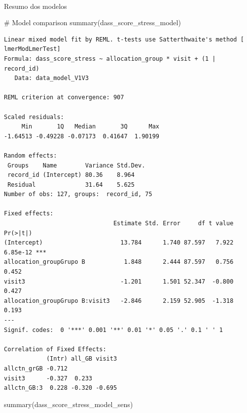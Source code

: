 \documentclass[
  letterpaper,
  DIV=11,
  numbers=noendperiod]{scrartcl}
\makeatletter
\let\oldparagraph\paragraph
\renewcommand{\paragraph}{
    \@ifstar
      \xxxParagraphStar
      \xxxParagraphNoStar
  }
\newcommand{\xxxParagraphStar}[1]{\oldparagraph*{#1}\mbox{}}
\newcommand{\xxxParagraphNoStar}[1]{\oldparagraph{#1}\mbox{}}
\newenvironment{Shaded}{\begin{snugshade}}{\end{snugshade}}
\newcommand{\CommentTok}[1]{\textcolor[rgb]{0.37,0.37,0.37}{#1}}
\newcommand{\FunctionTok}[1]{\textcolor[rgb]{0.28,0.35,0.67}{#1}}
\newcommand{\NormalTok}[1]{\textcolor[rgb]{0.00,0.23,0.31}{#1}}
\makeatother
\begin{document}
\paragraph{Resumo dos modelos}\label{resumo-dos-modelos-24}

\begin{Shaded}
\begin{Highlighting}[]
\CommentTok{\# Model comparison}
\FunctionTok{summary}\NormalTok{(dass\_score\_stress\_model)}
\end{Highlighting}
\end{Shaded}

\begin{verbatim}
Linear mixed model fit by REML. t-tests use Satterthwaite's method [
lmerModLmerTest]
Formula: dass_score_stress ~ allocation_group * visit + (1 | record_id)
   Data: data_model_V1V3

REML criterion at convergence: 907

Scaled residuals: 
     Min       1Q   Median       3Q      Max 
-1.64513 -0.49228 -0.07173  0.41647  1.90199 

Random effects:
 Groups    Name        Variance Std.Dev.
 record_id (Intercept) 80.36    8.964   
 Residual              31.64    5.625   
Number of obs: 127, groups:  record_id, 75

Fixed effects:
                               Estimate Std. Error     df t value Pr(>|t|)    
(Intercept)                      13.784      1.740 87.597   7.922 6.85e-12 ***
allocation_groupGrupo B           1.848      2.444 87.597   0.756    0.452    
visit3                           -1.201      1.501 52.347  -0.800    0.427    
allocation_groupGrupo B:visit3   -2.846      2.159 52.905  -1.318    0.193    
---
Signif. codes:  0 '***' 0.001 '**' 0.01 '*' 0.05 '.' 0.1 ' ' 1

Correlation of Fixed Effects:
            (Intr) all_GB visit3
allctn_grGB -0.712              
visit3      -0.327  0.233       
allctn_GB:3  0.228 -0.320 -0.695
\end{verbatim}

\begin{Shaded}
\begin{Highlighting}[]
\FunctionTok{summary}\NormalTok{(dass\_score\_stress\_model\_sens)}
\end{Highlighting}
\end{Shaded}
\end{document}
